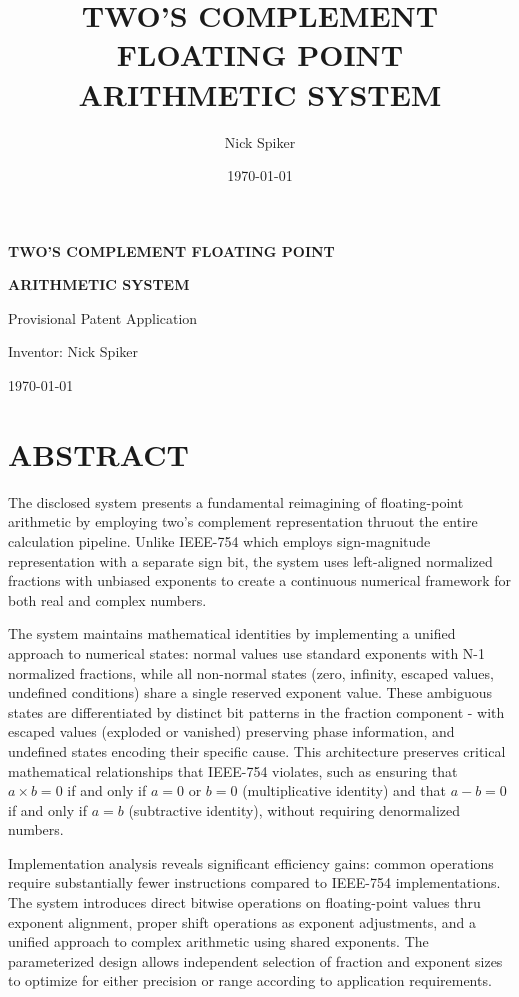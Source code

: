 \documentclass[12pt,letter]{article}
\title{\textbf{TWO'S COMPLEMENT FLOATING POINT ARITHMETIC SYSTEM}}
\author{Nick Spiker}
\date{\today}
\begin{document}
\begin{titlepage}
\begin{center}
\vspace*{1cm}
{\huge \textbf{TWO'S COMPLEMENT FLOATING POINT}\par}
{\huge \textbf{ARITHMETIC SYSTEM}\par}
\vspace{2cm}
{\Large Provisional Patent Application\par}
\vspace{2.5cm}
{\Large Inventor: Nick Spiker\par}
\vspace{1cm}
{\Large \today\par}
\end{center}
\end{titlepage}
\newpage

\setcounter{page}{2}
\section{ABSTRACT}

The disclosed system presents a fundamental reimagining of floating-point arithmetic by employing two's complement representation thruout the entire calculation pipeline. Unlike IEEE-754 which employs sign-magnitude representation with a separate sign bit, the system uses left-aligned normalized fractions with unbiased exponents to create a continuous numerical framework for both real and complex numbers.

The system maintains mathematical identities by implementing a unified approach to numerical states: normal values use standard exponents with N-1 normalized fractions, while all non-normal states (zero, infinity, escaped values, undefined conditions) share a single reserved exponent value. These ambiguous states are differentiated by distinct bit patterns in the fraction component - with escaped values (exploded or vanished) preserving phase information, and undefined states encoding their specific cause. This architecture preserves critical mathematical relationships that IEEE-754 violates, such as ensuring that $a\times b=0$ if and only if $a=0$ or $b=0$ (multiplicative identity) and that $a-b=0$ if and only if $a=b$ (subtractive identity), without requiring denormalized numbers.

Implementation analysis reveals significant efficiency gains: common operations require substantially fewer instructions compared to IEEE-754 implementations. The system introduces direct bitwise operations on floating-point values thru exponent alignment, proper shift operations as exponent adjustments, and a unified approach to complex arithmetic using shared exponents. The parameterized design allows independent selection of fraction and exponent sizes to optimize for either precision or range according to application requirements.
\end{document}
